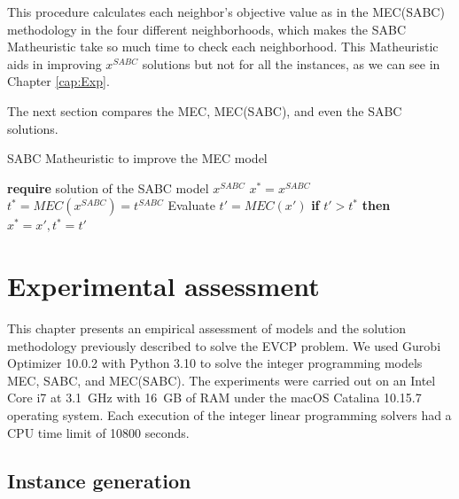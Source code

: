 This procedure calculates each neighbor's objective value as in the MEC(SABC) methodology in the four different neighborhoods, which makes the SABC Matheuristic take so much time to check each neighborhood. This Matheuristic aids in improving $x^{SABC}$ solutions but not for all the instances, as we can see in Chapter \ref{cap:Exp}.


The next section compares the MEC, MEC(SABC), and even the SABC solutions.  



\begin{algorithm}
\caption{SABC Matheuristic to improve the MEC model}\label{alg:cap_1}
\begin{algorithmic}[1]
\State \textbf{require} solution of the SABC model $x^{SABC}$
\State $x^* = x^{SABC}$
\State $t^* = MEC(x^{SABC}) = t^{SABC}$
		\State Evaluate $t'=MEC(x')$ 
    	\State \textbf{if } $t' > t^*$ \textbf{then}  $x^* = x', t^*=t'$ 
    \EndFor
\EndWhile
{}
\end{algorithmic}
\end{algorithm}



\chapter{Experimental assessment}\label{Exp}

  This chapter presents an empirical assessment of models and the solution methodology previously described to solve the EVCP problem.  
We used Gurobi Optimizer 10.0.2 with Python 3.10 to solve the integer programming models MEC, SABC, and MEC(SABC).
The experiments were carried out on an Intel Core i7 at 3.1~GHz with 16~GB of RAM under the macOS Catalina 10.15.7 operating system. Each execution of the integer linear programming solvers had a CPU time limit of 10800 seconds. 

\section{Instance generation} \label{instances}

